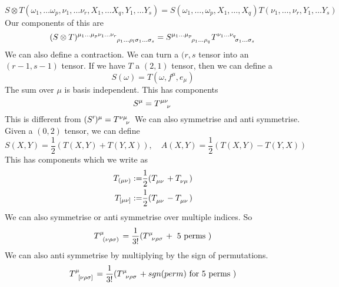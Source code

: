 \[
S \otimes T ( \omega_1, \dots \omega_p, \nu_1 , \dots \nu_{ r }, X_1, \dots X_q , Y_1, \dots Y_s )  = S( \omega_1 , \dots , \omega_p, X_1, \dots, X_q ) T ( \nu_1 , \dots,  \nu_r, Y_1 , \dots Y_s) 
\] 
Our components of this are 
\[
(  S\otimes T )\indices{ ^{ \mu_1 } ^{ \dots \mu_{ p }} ^{ \nu_{1 } \dots \nu_{ r }} _{ \rho_1 \dots \rho_{ l } \sigma_1 \dots \sigma _{ s}}} = S \indices{^{ \mu_1 \dots \mu_{ p}}_{ \rho_1 \dots \rho_{ q}}} T \indices{ ^{ \nu_1  \dots \nu_{ q }} _{ \sigma_{ 1} \dots \sigma_{ s}}}   
\] We can also define a contraction.
We can turn a $ ( r, s $ tensor into an  $ ( r - 1, s - 1) $ tensor. If we have
$ T $ a $ \left( 2, 1  \right) $ tensor, then we can define a 
\[
S( \omega  ) = T ( \omega  , f^\mu, e_\mu ) 
\] The sum over $ \mu $ is basis independent. 
This has components 
\[
S^\mu = T \indices{ ^\mu ^\nu _\nu }  
\] This is different from $ ( S ') ^\mu = T \indices{ ^\nu ^\mu _\nu} $ 
We can also symmetrise and anti symmetrise. Given a $ ( 0 , 2 ) $ tensor, 
we can define 
\[
S( X, Y ) = \frac{1}{ 2 } ( T ( X, Y ) + T ( Y , X) ), \quad A( X, Y ) = \frac{1}{2 } ( T ( X, Y ) - T ( Y , X) ) 
\] This has components which we write as 
\begin{align*}
T_{ ( \mu \nu ) } : = & \frac{1}{2 } ( T \indices{ _\mu_\nu} + T \indices{ _\nu_\mu} ) \\
T_{ [ \mu \nu ] } : = & \frac{1}{2 } ( T \indices{ _\mu_\nu} - T \indices{ _\mu_\nu}) 
\end{align*}
We can also symmetrise or anti symmetrise over multiple indices. 
So 
\[
T \indices{ ^\mu _{ ( \nu \rho \sigma  )  }}  = \frac{1}{ 3 ! } ( T \indices{^\mu _\nu _\rho _\sigma } + \text{ 5 perms } )  
\] We can also anti symmetrise by multiplying by the sign of permutations. 
\[
T \indices{ ^\mu _{ [  \nu \rho \sigma  ]   }}  = \frac{1}{ 3 ! } ( T \indices{^\mu _\nu _\rho _\sigma } + sgn ( perm)  \text{ for 5 perms } )
\]

\pagebreak
